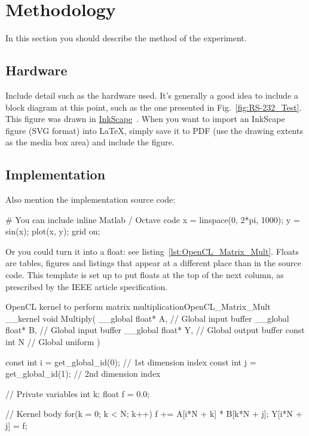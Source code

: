 \section{Methodology}

In this section you should describe the method of the experiment.

\subsection{Hardware}
Include detail such as the hardware used.  It's generally a good idea to include a block diagram at this point, such as the one presented in Fig.~\ref{fig:RS-232_Test}.  This figure was drawn in \href{http://www.inkscape.org/}{InkScape}~\cite{InkScape}.  When you want to import an InkScape figure (SVG format) into \LaTeX{}, simply save it to PDF (use the drawing extents as the media box area) and include the figure.


\subsection{Implementation}
Also mention the implementation source code:

\begin{Matlab}
  # You can include inline Matlab / Octave code
  x = linspace(0, 2*pi, 1000);
  y = sin(x);
  plot(x, y); grid on;
\end{Matlab}

Or you could turn it into a float: see listing~\ref{lst:OpenCL_Matrix_Mult}.  Floats are tables, figures and listings that appear at a different place than in the source code.  This template is set up to put floats at the top of the next column, as prescribed by the IEEE article specification.

\begin{OpenCL_float}{OpenCL kernel to perform matrix multiplication}{OpenCL_Matrix_Mult}
  __kernel void Multiply(
    __global float* A, // Global input buffer
    __global float* B, // Global input buffer
    __global float* Y, // Global output buffer
      const  int    N  // Global uniform
  ){
    const int i = get_global_id(0); // 1st dimension index
    const int j = get_global_id(1); // 2nd dimension index
   
    // Private variables
    int   k;
    float f = 0.0;
   
    // Kernel body
    for(k = 0; k < N; k++) f += A[i*N + k] * B[k*N + j];
    Y[i*N + j] = f;
  }
\end{OpenCL_float}


